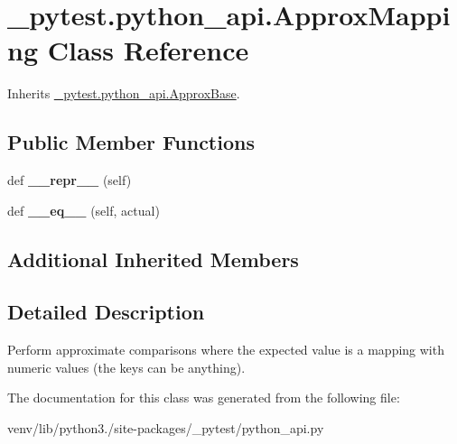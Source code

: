 \hypertarget{class__pytest_1_1python__api_1_1_approx_mapping}{}\section{\+\_\+pytest.\+python\+\_\+api.\+Approx\+Mapping Class Reference}
\label{class__pytest_1_1python__api_1_1_approx_mapping}


Inherits \hyperlink{class__pytest_1_1python__api_1_1_approx_base}{\+\_\+pytest.\+python\+\_\+api.\+Approx\+Base}.

\subsection*{Public Member Functions}
\begin{DoxyCompactItemize}
\item 
\mbox{\label{class__pytest_1_1python__api_1_1_approx_mapping_a830dbbcd77f07ef2d3124dbea5979db0}} 
def {\bfseries \+\_\+\+\_\+repr\+\_\+\+\_\+} (self)
\item 
\mbox{\label{class__pytest_1_1python__api_1_1_approx_mapping_a5a6466cc24954ef9cc341d4a00999c86}} 
def {\bfseries \+\_\+\+\_\+eq\+\_\+\+\_\+} (self, actual)
\end{DoxyCompactItemize}
\subsection*{Additional Inherited Members}


\subsection{Detailed Description}
\begin{DoxyVerb}Perform approximate comparisons where the expected value is a mapping with
numeric values (the keys can be anything).
\end{DoxyVerb}
 

The documentation for this class was generated from the following file\+:\begin{DoxyCompactItemize}
\item 
venv/lib/python3./site-\/packages/\+\_\+pytest/python\+\_\+api.\+py\end{DoxyCompactItemize}
